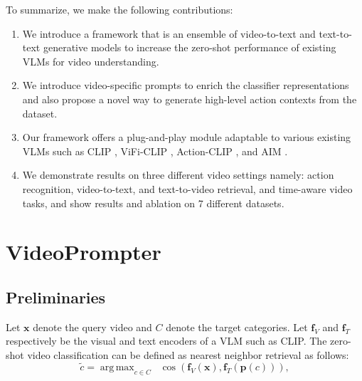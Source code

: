 \documentclass{article} \usepackage{iclr2024_conference,times}
\DeclareMathOperator*{\argmax}{arg\,max}
\begin{document}
To summarize, we make the following contributions:
\begin{enumerate}
        \item We introduce a framework that is an ensemble of video-to-text and text-to-text generative models to increase the zero-shot performance of existing VLMs for video understanding.        
        \item We introduce video-specific prompts to enrich the classifier representations and also propose a novel way to generate high-level action contexts from the dataset.
        \item Our framework offers a plug-and-play module adaptable to various existing VLMs such as CLIP \citep{radford2021learning}, ViFi-CLIP \citep{Rasheed_2023_CVPR}, Action-CLIP \citep{wang2021actionclip}, and AIM \citep{yang2023aim}.
        \item We demonstrate results on three different video settings namely: action recognition, video-to-text, and text-to-video retrieval, and time-aware video tasks, and show results and ablation on 7 different datasets.
\end{enumerate}







































\section{VideoPrompter}


\subsection{Preliminaries}
Let $\bm{x}$ denote the query video and $C$ denote the target categories. Let $\bm{f}_{V}$ and $\bm{f}_{T}$ respectively be the visual and text encoders of a VLM such as CLIP. The zero-shot video classification can be defined as nearest neighbor retrieval as follows:
\begin{equation}
    \tilde{c} = \argmax_{c\in C} \;\; \cos\left(\bm{f}_{V}(\bm{x}), \bm{f}_{T}(\bm{p}(c))\right),
\end{equation}
\end{document}
